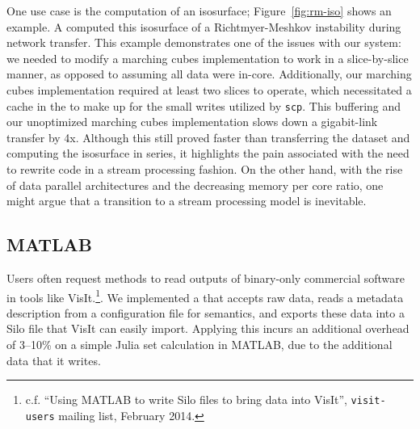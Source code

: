 One use case is the computation of an isosurface;
Figure~\ref{fig:rm-iso} shows an example.  A \freeprocessor{} computed
this isosurface of a Richtmyer-Meshkov instability during network
transfer.  This example demonstrates one of the issues with our system:
we needed to modify a marching cubes implementation to work in a
slice-by-slice manner, as opposed to assuming all data were in-core.
Additionally, our marching cubes implementation required at least two
slices to operate, which necessitated a cache in the
\freeprocessor{} to make up for the small writes utilized by
\texttt{scp}.  This buffering and our unoptimized marching cubes
implementation slows down a gigabit-link transfer by 4x.  Although
this still proved faster than transferring the dataset and computing
the isosurface in series, it highlights the pain associated with the
need to rewrite code in a stream processing fashion.  On the other
hand, with the rise of data parallel architectures and the decreasing
memory per core ratio, one might argue that a transition to a stream
processing model is inevitable.

%

\subsection{MATLAB}


Users often request methods to read outputs of binary-only commercial
software in tools like
VisIt.\footnote{c.f. ``Using MATLAB to write Silo files to bring
data into VisIt'', \texttt{visit-users} mailing list, February 2014.}.
We implemented a \freeprocessor{} that accepts raw data, reads a
metadata description from a configuration file for semantics, and
exports these data into a Silo file that VisIt can easily import.
Applying this
\freeprocessor{} incurs an additional overhead of 3--10\% on a simple
Julia set calculation in MATLAB, due to the additional data that it
writes.

